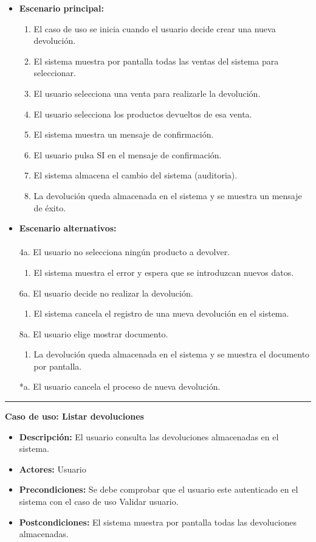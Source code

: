 \begin{itemize}\renewcommand{\labelitemi}{$\circ$}
 \item \textbf{Escenario principal:}
         \begin{enumerate}
          \item El caso de uso se inicia cuando el usuario decide crear una nueva devolución.
          \item El sistema muestra por pantalla todas las ventas del sistema para seleccionar.
	\item El usuario selecciona una venta para realizarle la devolución.
          \item El usuario selecciona los productos devueltos de esa venta.
  	  \item El sistema muestra un mensaje de confirmación.
          \item El usuario pulsa SI en el mensaje de confirmación.
 	  \item El sistema almacena el cambio del sistema (auditoria).
          \item La devolución queda almacenada en el sistema y se muestra un mensaje de éxito.
         \end{enumerate}
  \item \textbf{Escenario alternativos:}\\\\
	 4a. El usuario no selecciona ningún producto a devolver.
	      \begin{enumerate}
	       \item El sistema muestra el error y espera que se introduzcan nuevos datos.
	      \end{enumerate}
	 6a. El usuario decide no realizar la devolución.
	      \begin{enumerate}
	       \item El sistema cancela el registro de una nueva devolución en el sistema.
	      \end{enumerate}
         8a. El usuario elige mostrar documento.
	      \begin{enumerate}
	       \item La devolución queda almacenada en el sistema y se muestra el documento por pantalla.
	      \end{enumerate}
          *a. El usuario cancela el proceso de nueva devolución.
\end{itemize}
\smallskip
\hrule height 1pt
\smallskip
\textbf{Caso de uso: Listar devoluciones}
\begin{itemize}\renewcommand{\labelitemi}{$\cdot$}
 \item \textbf{Descripción:} El usuario consulta las devoluciones almacenadas en el sistema.
  \item \textbf{Actores:} Usuario
  \item \textbf{Precondiciones:} Se debe comprobar que el usuario este autenticado en el sistema con el caso de uso Validar usuario.
  \item \textbf{Postcondiciones:} El sistema muestra por pantalla todas las devoluciones almacenadas.
\end{itemize}
